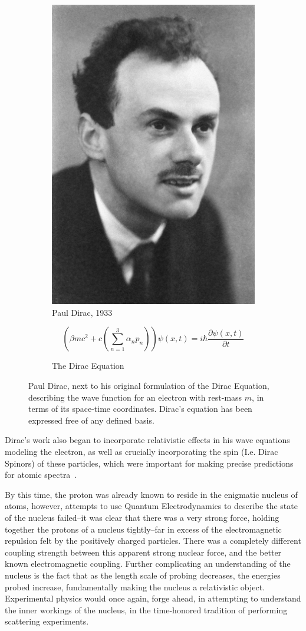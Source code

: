 \begin{figure}[ht]
	\centering
	\begin{subfigure}{.4\textwidth}
		\centering
		\includegraphics[width=0.4\linewidth]{./figures/pauldirac.jpg}
		\caption{Paul Dirac, 1933  \cite{NobelFoundation1933}}
		\label{fig:pauldirac}
	\end{subfigure}%
	\begin{subfigure}{0.6\textwidth}
		\centering
		\begin{equation}
			\left(\beta mc^2 + c\left(\sum_{n \mathop =1}^{3}\alpha_n p_n\right)\right) \psi (x,t) = i \hbar \frac{\partial\psi(x,t) }{\partial t}
		\end{equation}
		\caption{The Dirac Equation}
		\label{eq:diracquation}
	\end{subfigure}
	\caption{ 
		Paul Dirac, next to his original formulation of the Dirac Equation,
		describing the wave function for an electron with rest-mass $m$, in terms of
		its space-time coordinates. Dirac's equation has been expressed free of any
    defined basis.
	}
	\label{fig:thomsonrays}
\end{figure}

Dirac's work also began to incorporate relativistic effects in his wave
equations modeling the electron, as well as crucially incorporating the spin
(I.e. Dirac Spinors) of these particles, which were important for making precise
predictions for atomic spectra~\cite{Dirac}.

By this time, the proton was already known to reside in the enigmatic nucleus of
atoms, however, attempts to use Quantum Electrodynamics to describe the state of
the nucleus failed--it was clear that there was a very strong force, holding
together the protons of a nucleus tightly--far in excess of the electromagnetic
repulsion felt by the positively charged particles. There was a completely
different coupling strength between this apparent strong nuclear force, and the
better known electromagnetic coupling. Further complicating an understanding of
the nucleus is the fact that as the length scale of probing decreases, the
energies probed increase, fundamentally making the nucleus a relativistic
object. Experimental physics would once again, forge ahead, in attempting to
understand the inner workings of the nucleus, in the time-honored tradition of
performing scattering experiments.

